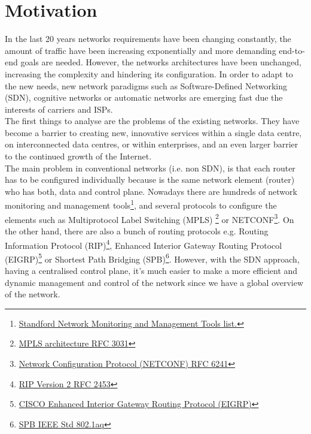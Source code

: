 \section{Motivation}
\label{sec:motivation}

In the last 20 years networks requirements have been changing constantly, the amount of traffic have been increasing exponentially and more demanding end-to-end goals are needed. However, the networks architectures have been unchanged, increasing the complexity and hindering its configuration. In order to adapt to the new needs, new network paradigms such as Software-Defined Networking (SDN), cognitive networks or automatic networks are emerging fast due the interests of carriers and ISPs.\\ 

The first things to analyse are the problems of the existing networks. They have become a barrier to creating new, innovative services within a single data centre, on interconnected data centres, or within enterprises, and an even larger barrier to the continued growth of the Internet.\\

The main problem in conventional networks (i.e. non SDN), is that each router has to be configured individually because is the same network element (router) who has both, data and control plane. Nowadays there are hundreds of network monitoring and management tools\footnote{\href{http://www.slac.stanford.edu/xorg/nmtf/nmtf-tools.html}{Standford Network Monitoring and Management Tools list.}}, and several protocols to configure the elements such as Multiprotocol Label Switching (MPLS) \footnote{\href{http://www.ietf.org/rfc/rfc3031.txt}{MPLS architecture RFC 3031}} or NETCONF\footnote{\href{http://tools.ietf.org/html/rfc6241}{Network Configuration Protocol (NETCONF) RFC 6241}}. On the other hand, there are also a bunch of routing protocols e.g. Routing Information Protocol (RIP)\footnote{\href{http://tools.ietf.org/html/rfc2453}{RIP Version 2 RFC 2453}}, Enhanced Interior Gateway Routing Protocol (EIGRP)\footnote{\href{http://www.cisco.com/c/en/us/products/ios-nx-os-software/enhanced-interior-gateway-routing-protocol-eigrp/index.html}{CISCO Enhanced Interior Gateway Routing Protocol (EIGRP)}} or Shortest Path Bridging (SPB)\footnote{\href{http://standards.ieee.org/getieee802/download/802.1aq-2012.pdf}{SPB IEEE Std 802.1aq}}. However, with the SDN approach, having a centralised control plane, it's much easier to make a more efficient and dynamic management and control of the network since we have a global overview of the network.\\

